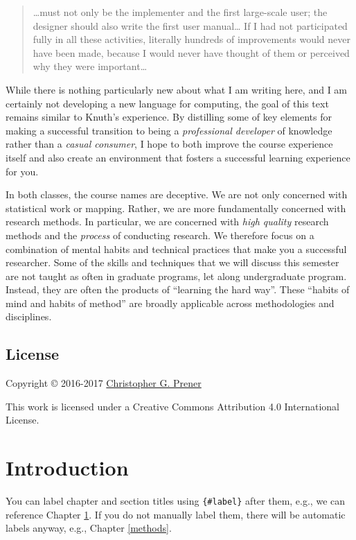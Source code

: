 \documentclass[]{book}
\theoremstyle{definition}
\theoremstyle{definition}
\theoremstyle{definition}
\theoremstyle{remark}
\begin{document}
\begin{quote}
\ldots{}must not only be the implementer and the first large-scale user;
the designer should also write the first user manual\ldots{} If I had
not participated fully in all these activities, literally hundreds of
improvements would never have been made, because I would never have
thought of them or perceived why they were important\ldots{}
\end{quote}

While there is nothing particularly new about what I am writing here,
and I am certainly not developing a new language for computing, the goal
of this text remains similar to Knuth's experience. By distilling some
of key elements for making a successful transition to being a
\emph{professional developer} of knowledge rather than a \emph{casual
consumer}, I hope to both improve the course experience itself and also
create an environment that fosters a successful learning experience for
you.

In both classes, the course names are deceptive. We are not only
concerned with statistical work or mapping. Rather, we are more
fundamentally concerned with research methods. In particular, we are
concerned with \emph{high quality} research methods and the
\emph{process} of conducting research. We therefore focus on a
combination of mental habits and technical practices that make you a
successful researcher. Some of the skills and techniques that we will
discuss this semester are not taught as often in graduate programs, let
along undergraduate program. Instead, they are often the products of
``learning the hard way''. These ``habits of mind and habits of method''
are broadly applicable across methodologies and disciplines.

\section*{License}\label{license}

Copyright © 2016-2017 \href{https://chris-prener.github.io}{Christopher
G. Prener}

This work is licensed under a Creative Commons Attribution 4.0
International License.

\chapter{Introduction}\label{intro}

You can label chapter and section titles using \texttt{\{\#label\}}
after them, e.g., we can reference Chapter \ref{intro}. If you do not
manually label them, there will be automatic labels anyway, e.g.,
Chapter \ref{methods}.
\end{document}
